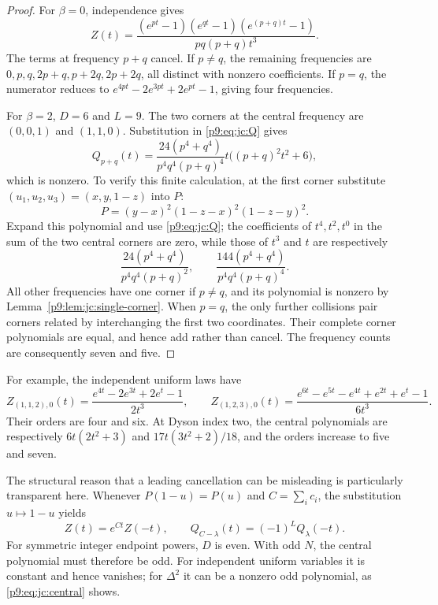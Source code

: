 \documentclass[11pt,a4paper]{article}
\theoremstyle{definition}
\theoremstyle{remark}
\numberwithin{equation}{section}
\begin{document}
\begin{proof}
For $\beta=0$, independence gives
\[
 Z(t)=\frac{(e^{pt}-1)(e^{qt}-1)(e^{(p+q)t}-1)}{pq(p+q)t^3}.
\]
The terms at frequency $p+q$ cancel.  If $p\ne q$, the remaining
frequencies are $0,p,q,2p+q,p+2q,2p+2q$, all distinct with
nonzero coefficients.  If $p=q$, the numerator reduces to
$e^{4pt}-2e^{3pt}+2e^{pt}-1$, giving four frequencies.

For $\beta=2$, $D=6$ and $L=9$.  The two corners at the central
frequency are $(0,0,1)$ and $(1,1,0)$.  Substitution in
\eqref{p9:eq:jc:Q} gives
\begin{equation}\label{p9:eq:jc:central}
 Q_{p+q}(t)=
 \frac{24(p^4+q^4)}{p^4q^4(p+q)^4}
      t\bigl((p+q)^2t^2+6\bigr),
\end{equation}
which is nonzero.  To verify this finite calculation, at the first
corner substitute $(u_1,u_2,u_3)=(x,y,1-z)$ into $P$:
\[
 P=(y-x)^2(1-z-x)^2(1-z-y)^2.
\]
Expand this polynomial and use \eqref{p9:eq:jc:Q}; the coefficients
of $t^4,t^2,t^0$ in the sum of the two central corners are zero,
while those of $t^3$ and $t$ are respectively
\[
 \frac{24(p^4+q^4)}{p^4q^4(p+q)^2},\qquad
 \frac{144(p^4+q^4)}{p^4q^4(p+q)^4}.
\]
All other frequencies have one corner if $p\ne q$, and its
polynomial is nonzero by Lemma~\ref{p9:lem:jc:single-corner}.
When $p=q$, the only further collisions pair corners related by
interchanging the first two coordinates.  Their complete corner
polynomials are equal, and hence add rather than cancel.
The frequency counts are consequently seven and five.
\end{proof}

For example, the independent uniform laws have
\[
 Z_{(1,1,2),0}(t)=\frac{e^{4t}-2e^{3t}+2e^t-1}{2t^3},\qquad
 Z_{(1,2,3),0}(t)=\frac{e^{6t}-e^{5t}-e^{4t}+e^{2t}+e^t-1}{6t^3}.
\]
Their orders are four and six.  At Dyson index two, the central
polynomials are respectively $6t(2t^2+3)$ and
$17t(3t^2+2)/18$, and the orders increase to five and seven.

The structural reason that a leading cancellation can be misleading
is particularly transparent here.  Whenever $P(1-u)=P(u)$ and
$C=\sum_i c_i$, the substitution $u\mapsto1-u$ yields
\[
 Z(t)=e^{Ct}Z(-t),\qquad
 Q_{C-\lambda}(t)=(-1)^LQ_\lambda(-t).
\]
For symmetric integer endpoint powers, $D$ is even.  With odd $N$,
the central polynomial must therefore be odd.  For independent
uniform variables it is constant and hence vanishes; for
$\Delta^2$ it can be a nonzero odd polynomial, as
\eqref{p9:eq:jc:central} shows.
\end{document}
